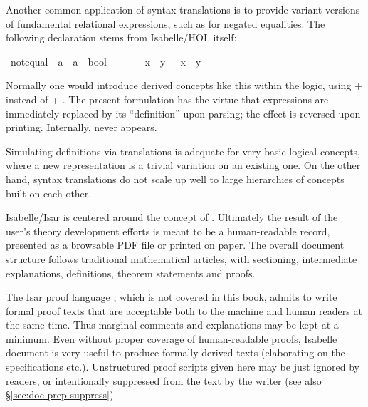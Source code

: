 \begin{isabellebody}
\begin{isamarkuptext}
  \medskip Another common application of syntax translations is to
  provide variant versions of fundamental relational expressions, such
  as \isa{{\isasymnoteq}} for negated equalities.  The following declaration
  stems from Isabelle/HOL itself:%
\end{isamarkuptext}%
\isamarkuptrue%
\ {\isachardoublequote}{\isacharunderscore}not{\isacharunderscore}equal{\isachardoublequote}\ {\isacharcolon}{\isacharcolon}\ {\isachardoublequote}{\isacharprime}a\ {\isasymRightarrow}\ {\isacharprime}a\ {\isasymRightarrow}\ bool{\isachardoublequote}\ \ \ \ {\isacharparenleft}\ {\isachardoublequote}{\isasymnoteq}{\isasymignore}{\isachardoublequote}\ {}{}{\isacharparenright}\isanewline
\isamarkupfalse%
\ {\isachardoublequote}x\ {\isasymnoteq}{\isasymignore}\ y{\isachardoublequote}\ {\isasymrightleftharpoons}\ {\isachardoublequote}{\isasymnot}\ {\isacharparenleft}x\ {\isacharequal}\ y{\isacharparenright}{\isachardoublequote}\isamarkupfalse%
%
\begin{isamarkuptext}%
\noindent Normally one would introduce derived concepts like this
  within the logic, using  + 
  instead of  + .  The
  present formulation has the virtue that expressions are immediately
  replaced by its ``definition'' upon parsing; the effect is reversed
  upon printing.  Internally, \isa{{\isasymnoteq}} never appears.

  Simulating definitions via translations is adequate for very basic
  logical concepts, where a new representation is a trivial variation
  on an existing one.  On the other hand, syntax translations do not
  scale up well to large hierarchies of concepts built on each other.%
\end{isamarkuptext}%
\isamarkuptrue%
%
\isamarkuptrue%
%
\begin{isamarkuptext}%
Isabelle/Isar is centered around the concept of .  Ultimately the result of
  the user's theory development efforts is meant to be a
  human-readable record, presented as a browsable PDF file or printed
  on paper.  The overall document structure follows traditional
  mathematical articles, with sectioning, intermediate explanations,
  definitions, theorem statements and proofs.

  The Isar proof language \cite{Wenzel-PhD}, which is not covered in
  this book, admits to write formal proof texts that are acceptable
  both to the machine and human readers at the same time.  Thus
  marginal comments and explanations may be kept at a minimum.  Even
  without proper coverage of human-readable proofs, Isabelle document
  is very useful to produce formally derived texts (elaborating on the
  specifications etc.).  Unstructured proof scripts given here may be
  just ignored by readers, or intentionally suppressed from the text
  by the writer (see also \S\ref{sec:doc-prep-suppress}).


\end{isamarkuptext}
\end{isabellebody}
